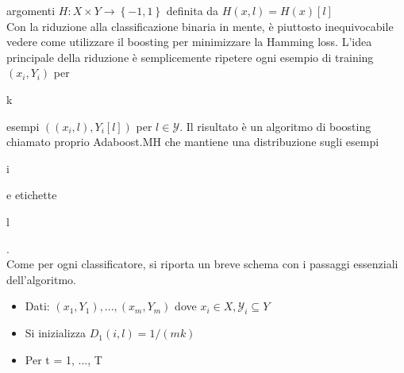 argomenti \begin{math}
           H : X \times Y \rightarrow \left\{-1,1\right\}
          \end{math} definita da \begin{math}
                                  H(x,l) = H(x)\left[l\right]
                                 \end{math}\\
\newline
Con la riduzione alla classificazione binaria in mente, \`e piuttosto inequivocabile vedere come utilizzare 
il boosting per minimizzare la Hamming loss. L'idea principale della riduzione \`e semplicemente ripetere ogni 
esempio di training \begin{math}
                     (x_i,Y_i)
                    \end{math} per \begin{it}k\end{it} esempi 
\begin{math}
 ((x_i,l),Y_i\left[l\right])
\end{math} per \begin{math}
                l \in \mathcal{Y}
               \end{math}. Il risultato \`e un algoritmo di boosting chiamato proprio Adaboost.MH che mantiene 
una distribuzione sugli esempi \begin{it}i\end{it} e etichette \begin{it}l\end{it}.\\
Come per ogni classificatore, si riporta un breve schema con i passaggi essenziali dell'algoritmo.
\begin{itemize}
 \item Dati: \begin{math}
              (x_1,Y_1), ..., (x_m,Y_m)
             \end{math} dove \begin{math}
                              x_i \in X, \mathcal{Y}_i \subseteq Y
                             \end{math}
 \item Si inizializza \begin{math}
                       D_1(i,l) = 1/(mk)
                      \end{math}
 \item Per t = 1, ..., T
\end{itemize}

